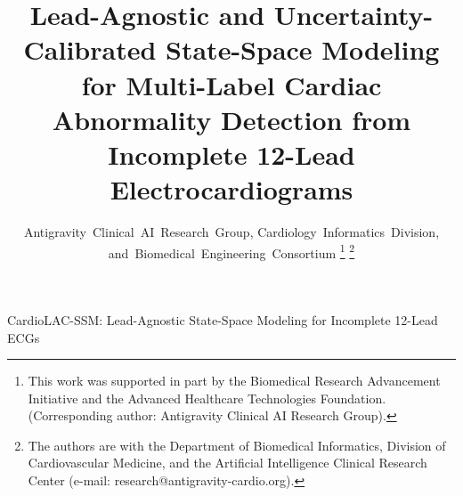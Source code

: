 \documentclass[journal,11pt,draftclsnofoot,onecolumn]{IEEEtran}
\begin{document}
\title{Lead-Agnostic and Uncertainty-Calibrated State-Space Modeling for Multi-Label Cardiac Abnormality Detection from Incomplete 12-Lead Electrocardiograms}

\author{Antigravity~Clinical~AI~Research~Group,
        Cardiology~Informatics~Division,
        and~Biomedical~Engineering~Consortium%
\thanks{This work was supported in part by the Biomedical Research Advancement Initiative and the Advanced Healthcare Technologies Foundation. (Corresponding author: Antigravity Clinical AI Research Group).}%
\thanks{The authors are with the Department of Biomedical Informatics, Division of Cardiovascular Medicine, and the Artificial Intelligence Clinical Research Center (e-mail: research@antigravity-cardio.org).}}

%
{CardioLAC-SSM: Lead-Agnostic State-Space Modeling for Incomplete 12-Lead ECGs}

\maketitle
\end{document}
